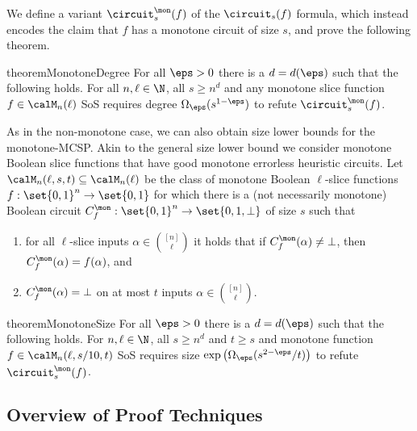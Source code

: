 We define a variant $\circuit_s^{\mon}(f)$ of the $\circuit_s(f)$
formula, which instead encodes the claim that $f$ has a monotone
circuit of size $s$, and prove the following theorem.

\begin{restatable}{theorem}{MonotoneDegree}
  \label{thm:main-monotone-degree}
  For all $\eps > 0$ there is a $d = d(\eps)$ such that the following
  holds.  For all $n, \ell \in \N$, all $s \ge n^{d}$ and any monotone
  slice function $f \in \calM_n(\ell)$ SoS requires degree
  $\Omega_\eps(s^{1-\eps})$ to refute
  $\circuit_s^{\mon}(f)$.
\end{restatable}

As in the non-monotone case, we can also obtain size lower bounds for
the monotone-MCSP. Akin to the general size lower bound we consider
monotone Boolean slice functions that have good monotone errorless
heuristic circuits. Let $\calM_n(\ell, s, t) \subseteq \calM_n(\ell)$
be the class of monotone Boolean $\ell$-slice functions
$f: \set{0,1}^n \rightarrow \set{0,1}$ for which there is a
(not necessarily monotone) Boolean circuit
$C_f^\mon: \set{0,1}^n \rightarrow \set{0,1, \bot}$ of size $s$ such
that
\begin{enumerate}
\item for all $\ell$-slice inputs $\alpha \in \binom{[n]}{\ell}$ it
  holds that if $C^\mon_f(\alpha) \neq \bot$, then
  $C^\mon_f(\alpha) = f(\alpha)$, and
\item $C^\mon_f(\alpha) = \bot$ on at most $t$ inputs
  $\alpha \in \binom{[n]}{\ell}$.
\end{enumerate}

\begin{restatable}{theorem}{MonotoneSize}
  \label{thm:main-monotone-size}
  For all $\eps > 0$ there is a $d = d(\eps)$ such that the following
  holds.  For $n, \ell \in \N$, all $s \ge n^{d}$ and $t \ge s$ and
  monotone function $f \in \calM_n(\ell, s/10, t)$ SoS requires size
  $\exp\big(\Omega_\eps(s^{2-\eps}/t)\big)$ to refute
  $\circuit_s^{\mon}(f)$.
\end{restatable}

\subsection{Overview of Proof Techniques}

